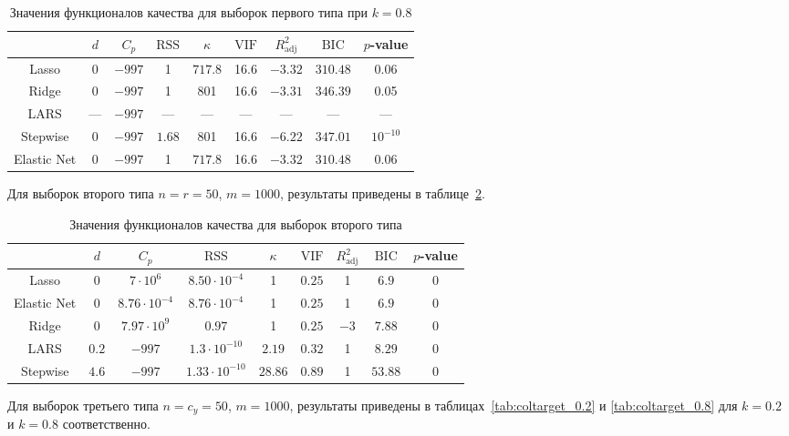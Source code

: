 \documentclass[a4paper,12pt]{article}
\newcommand{\vif}{\mathrm{VIF}}
\newcommand{\rss}{\mathrm{RSS}}
\newcommand{\bic}{\mathrm{BIC}}
\newcommand{\radj}{R_{\text{adj}}^2}
\begin{document}
\begin{table}[h]
\centering
\caption{Значения функционалов качества для выборок первого типа при $k = 0.8$}
\begin{tabular}{|c|c|c|c|c|c|c|c|c|}
\hline 
 & $d$ & $C_p$ & $\rss$ & $\kappa$ & $\vif$ & $\radj$ & $\bic$ & $p$-value \\ 
\hline 
Lasso & 0  &	$-997$ & 1 & $717.8$ & 16.6 & $-3.32$ & $310.48$ & 0.06 \\ 
\hline 
Ridge & 0 & $-997$ & 1 & 801 & 16.6 & $-3.31$ & $346.39$ & 0.05 \\ 
\hline 
LARS & --- & $-997$ & --- & --- & --- & --- & --- & --- \\ 
\hline 
Stepwise & 0 & $-997$ & $1.68$ & 801 & 16.6 & $-6.22$ & $347.01$ & $10^{-10}$ \\
\hline
Elastic Net & 0 & $-997$ & 1 & $717.8$ & 16.6 & $-3.32$ & $310.48$ & 0.06 \\
\hline
\end{tabular}
\label{tab:ortcol_0.8}
\end{table}
Для выборок второго типа $n = r = 50$, $m = 1000$, результаты приведены в таблице~\ref{tab:random}.
\begin{table}[h]
\centering
\caption{Значения функционалов качества для выборок второго типа}
\begin{tabular}{|c|c|c|c|c|c|c|c|c|}
\hline 
 & $d$ & $C_p$ & $\rss$ & $\kappa$ & $\vif$ & $\radj$ & $\bic$ & $p$-value \\ 
\hline 
Lasso & 0 & $7 \cdot 10^6$ & $8.50 \cdot 10^{-4}$ & 1 & $0.25$ & 1 & $6.9$  & 0 \\ 
\hline
Elastic Net & 0 & $8.76 \cdot 10^{-4}$ & $8.76 \cdot 10^{-4}$ & 1 & $0.25$ & 1 & $ 6.9 $ & 0 \\
\hline
Ridge & 0 & $7.97 \cdot 10^9$ & $0.97$ & 1 & $0.25$ & $-3$ & $ 7.88 $ & 0 \\ 
\hline
LARS & $0.2$ & $-997$ & $1.3 \cdot 10^{-10}$ & $2.19$  & $0.32$ & 1 & $8.29$ & 0 \\ 
\hline 
Stepwise & $4.6$ & $-997$ & $1.33\cdot 10^{-10}$ & $28.86$ & $0.89$ & 1 & $ 53.88$ & 0 \\
\hline  
\end{tabular}
\label{tab:random}
\end{table}
Для выборок третьего типа $n = c_y = 50$, $m = 1000$, результаты приведены в таблицах~\ref{tab:coltarget_0.2} и \ref{tab:coltarget_0.8} для $k = 0.2$ и $k = 0.8$ соответственно.  
\end{document}
